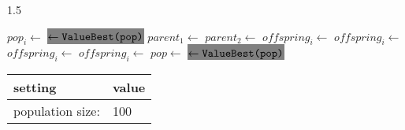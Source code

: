 \begin{algorithm-wide}[!t]{1.5\textwidth}%
\begin{footnotesize}
\begin{minipage}[!T]{0.52\linewidth}
\centering
\begin{algorithmic}[1]
 \label{alg_lssMAts_For1}
    \STATE $pop_i\gets$ 
    \STATE {}
\ENDFOR \label{alg_lssMAts_For2}
\STATE \colorbox{Gray}{ $\gets \texttt{{ValueBest}(pop)}$}
         \label{alg_lssMAts_Rec1}
            \STATE $parent_1 \gets $
            \STATE $parent_2 \gets $
            \STATE $\mathit{offspring_i}\gets$
        \ELSE
            \STATE $\mathit{offspring}_i \gets $
        \ENDIF \label{alg_lssMAts_Rec2}
         \label{alg_lssMAts_Mut1}
            \STATE $\mathit{offspring}_i \gets $
        \ENDIF \label{alg_lssMAts_Mut2}
        \STATE $\mathit{offspring}_i \gets$
        \STATE {}
    \ENDFOR
    \STATE $pop \gets$ \label{alg_lssMAts_Sel}
    \STATE \colorbox{Gray}{ $\gets \texttt{{ValueBest}(pop)}$}
\ENDWHILE
\ENDPROCEDURE 
\end{algorithmic}
\end{minipage}
\begin{minipage}[!T]{0.52\linewidth}
\par\vspace*{1ex}
\begin{tabular}{l l}
 {\bf setting} & {\bf value} \\
 \hline
 population size: & 100 \\

\end{tabular}
\end{minipage}
\end{footnotesize}
\end{algorithm-wide}
